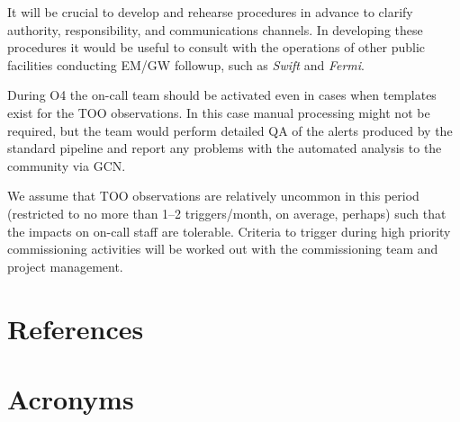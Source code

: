 \documentclass[DM,authoryear,toc]{lsstdoc}
\begin{document}
It will be crucial to develop and rehearse procedures in advance to clarify authority, responsibility, and communications channels.
In developing these procedures it would be useful to consult with the operations of other public facilities conducting EM/GW followup, such as \textit{Swift} and \textit{Fermi}.

During O4 the on-call team should be activated even in cases when templates exist for the TOO observations.
In this case manual processing might not be required, but the team would perform detailed QA of the alerts produced by the standard pipeline and report any problems with the automated analysis to the community via GCN.

We assume that TOO observations are relatively uncommon in this period (restricted to no more than 1--2 triggers/month, on average, perhaps) such that the impacts on on-call staff are tolerable.
Criteria to trigger during high priority commissioning activities will be worked out with the commissioning team and project management.


\appendix
\section{References} \label{sec:bib}
\renewcommand{\refname}{} %


\section{Acronyms} \label{sec:acronyms}

\end{document}
